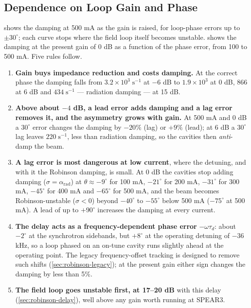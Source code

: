 \subsection{Dependence on Loop Gain and Phase}\label{sec:robinson-gain}

 shows the damping at 500 mA as the gain is raised, for loop-phase errors up to \(\pm 30^\circ\); each curve stops where the field loop itself becomes unstable.  shows the damping at the present gain of 0 dB as a function of the phase error, from 100 to 500 mA. Five rules follow.

\begin{enumerate}
\item \textbf{Gain buys impedance reduction and costs damping.} At the correct phase the damping falls from \(3.2\times10^3\;\text{s}^{-1}\) at \(-6\) dB to \(1.9\times10^3\) at 0 dB, 866 at 6 dB and \(434\;\text{s}^{-1}\) --- radiation damping --- at 15 dB.
\item \textbf{Above about \(-4\) dB, a lead error adds damping and a lag error removes it, and the asymmetry grows with gain.} At 500 mA and 0 dB a \(30^\circ\) error changes the damping by \(-20\%\) (lag) or \(+9\%\) (lead); at 6 dB a \(30^\circ\) lag leaves \(220\;\text{s}^{-1}\), less than radiation damping, so the cavities then \emph{anti}-damp the beam.
\item \textbf{A lag error is most dangerous at low current}, where the detuning, and with it the Robinson damping, is small. At 0 dB the cavities stop adding damping (\(\sigma = \alpha_\text{rad}\)) at \(\theta \approx -9^\circ\) for 100 mA, \(-21^\circ\) for 200 mA, \(-31^\circ\) for 300 mA, \(-45^\circ\) for 400 mA and \(-65^\circ\) for 500 mA, and the beam becomes Robinson-unstable (\(\sigma < 0\)) beyond \(-40^\circ\) to \(-55^\circ\) below 500 mA (\(-75^\circ\) at 500 mA). A lead of up to \(+90^\circ\) increases the damping at every current.
\item \textbf{The delay acts as a frequency-dependent phase error} \(-\omega\tau_d\): about \(-2^\circ\) at the synchrotron sidebands, but \(+8^\circ\) at the operating detuning of \(-36\) kHz, so a loop phased on an on-tune cavity runs slightly ahead at the operating point. The legacy frequency-offset tracking is designed to remove such shifts (\cref{sec:robinson-legacy}); at the present gain either sign changes the damping by less than 5\%.
\item \textbf{The field loop goes unstable first, at 17--20 dB} with this delay (\cref{sec:robinson-delay}), well above any gain worth running at SPEAR3.
\end{enumerate}

